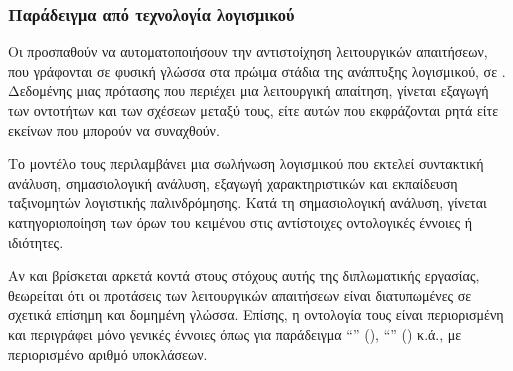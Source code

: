 \subsubsection{Παράδειγμα από τεχνολογία λογισμικού}
Οι \citet{diamantopoulos2017software} προσπαθούν να αυτοματοποιήσουν την αντιστοίχηση λειτουργικών απαιτήσεων,
που γράφονται σε φυσική γλώσσα στα πρώιμα στάδια της ανάπτυξης λογισμικού,
σε .
Δεδομένης μιας πρότασης που περιέχει μια λειτουργική απαίτηση, γίνεται εξαγωγή των οντοτήτων και των σχέσεων μεταξύ τους,
είτε αυτών που εκφράζονται ρητά είτε εκείνων που μπορούν να συναχθούν.

Το μοντέλο τους περιλαμβάνει μια σωλήνωση λογισμικού που εκτελεί συντακτική ανάλυση, σημασιολογική ανάλυση, εξαγωγή χαρακτηριστικών και εκπαίδευση ταξινομητών λογιστικής παλινδρόμησης.
Κατά τη σημασιολογική ανάλυση, γίνεται κατηγοριοποίηση των όρων του κειμένου στις αντίστοιχες οντολογικές έννοιες ή ιδιότητες.

Αν και βρίσκεται αρκετά κοντά στους στόχους αυτής της διπλωματικής εργασίας, θεωρείται ότι οι προτάσεις των λειτουργικών απαιτήσεων είναι διατυπωμένες σε σχετικά επίσημη και δομημένη γλώσσα.
Επίσης, η οντολογία τους είναι περιορισμένη και περιγράφει μόνο γενικές έννοιες όπως για παράδειγμα \enquote{} (), \enquote{} () κ.ά.,
με περιορισμένο αριθμό υποκλάσεων.


